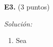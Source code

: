 \textbf{E3.} (3 puntos)


\vspace{20px}
\textit{Solución:}
\\

\begin{enumerate}
[label=\alph*)]
    \item Sea


\end{enumerate}